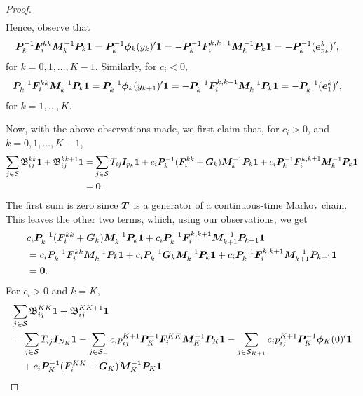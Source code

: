 \begin{proof}
\begin{align*}
	\end{align*}
	Hence, observe that 
	\begin{align*}
		&\boldsymbol P_k^{-1}\boldsymbol F_i^{kk} \boldsymbol M_k^{-1} \boldsymbol P_k \boldsymbol 1 = \boldsymbol P_k^{-1} \boldsymbol \phi_k(y_k)'\boldsymbol 1 = -\boldsymbol P_k^{-1}\boldsymbol F_i^{k,k+1} \boldsymbol M_k^{-1} \boldsymbol P_k \boldsymbol 1 = - \boldsymbol P_k^{-1}(\boldsymbol e_{p_k}^k)',
	\end{align*}
	for \(k=0,1,\dots,K-1\). 
	Similarly, for \(c_i<0\), 
	\begin{align*}
		&\boldsymbol P_k^{-1}\boldsymbol F_i^{kk} \boldsymbol M_k^{-1} \boldsymbol P_k \boldsymbol 1 = \boldsymbol P_k^{-1} \boldsymbol \phi_k(y_{k+1})'\boldsymbol 1 = -\boldsymbol P_k^{-1}\boldsymbol F_i^{k,k-1} \boldsymbol M_k^{-1} \boldsymbol P_k \boldsymbol 1 = - \boldsymbol P_k^{-1}(\boldsymbol e_{1}^k)',
	\end{align*}
	for \(k=1,\dots,K\). 

	Now, with the above observations made, we first claim that, for \(c_i>0\), and \(k=0,1,...,K-1\), 
	\begin{align*}
		\sum_{j\in\mathcal{S}}\mathfrak{\boldsymbol B}^{kk}_{ij}\boldsymbol 1 + \mathfrak{\boldsymbol B}^{kk+1}_{ij}\boldsymbol 1
		&=\sum_{j\in\mathcal{S}}T_{ij}\boldsymbol I_{p_k}\boldsymbol 1 + c_i \boldsymbol P_k^{-1}(\boldsymbol F_i^{kk}+\boldsymbol G_k)\boldsymbol M_k^{-1}\boldsymbol P_k\boldsymbol 1 + c_i \boldsymbol P_k^{-1}\boldsymbol F_i^{k,k+1}\boldsymbol M_k^{-1}\boldsymbol P_k\boldsymbol 1 
		\\&=\boldsymbol 0.
	\end{align*}
	The first sum is zero since \(\boldsymbol T\) is a generator of a continuous-time Markov chain. This leaves the other two terms, which, using our observations, we get 
	\begin{align*}
		& c_i \boldsymbol P_k^{-1}(\boldsymbol F_i^{kk}+\boldsymbol G_k)\boldsymbol M_k^{-1}\boldsymbol P_k\boldsymbol 1 + c_i \boldsymbol P_k^{-1}\boldsymbol F_i^{k,k+1}\boldsymbol M_{k+1}^{-1}\boldsymbol P_{k+1}\boldsymbol 1
		\\&= c_i \boldsymbol P_k^{-1}\boldsymbol F_i^{kk} \boldsymbol M_k^{-1}\boldsymbol P_k\boldsymbol 1 + c_i \boldsymbol P_k^{-1}\boldsymbol G_k\boldsymbol M_k^{-1}\boldsymbol P_k\boldsymbol 1 + c_i \boldsymbol P_k^{-1}\boldsymbol F_i^{k,k+1}\boldsymbol M_{k+1}^{-1}\boldsymbol P_{k+1}\boldsymbol 1 
		\\&= \boldsymbol 0.
	\end{align*}
	For \(c_i>0\) and \(k=K\), 
	\begin{align*}
		&\sum_{j\in\calS}\mathfrak{\bs B}^{KK}_{ij}\bs 1 + \mathfrak{\bs B}^{K{K+1}}_{ij}\bs 1
		\\&= \sum_{j\in\calS}T_{ij}\bs I_{N_K}\bs 1-\sum_{j\in\calS_-} c_ip_{ij}^{K+1} \bs P_K^{-1}\bs F_i^{KK}\bs M_K^{-1}\bs P_K \bs 1 -\sum_{j\in\calS_{{K+1} }}c_ip_{ij}^{K+1} \bs P_K^{-1}\boldsymbol \phi_K(0)\tr{}\bs 1 
		\\&\quad{} + c_i \bs P_K^{-1}(\bs F_i^{KK}+\bs G_K)\bs M_K^{-1}\bs P_K\boldsymbol 1 

\end{align*}
\end{proof}
